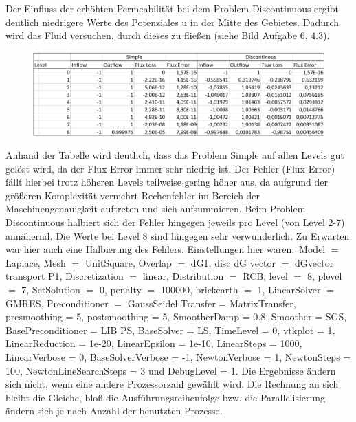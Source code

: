 \documentclass[12pt,a4paper]{scrartcl}
\numberwithin{equation}{section}
\begin{document}
\begin{enumerate}[label=(\roman*)]
%
Der Einfluss der erhöhten Permeabilität bei dem Problem Discontinuous ergibt deutlich niedrigere Werte des Potenziales u in der Mitte des Gebietes. Dadurch wird das Fluid versuchen, durch dieses zu fließen (siehe Bild Aufgabe 6, 4.3).
\begin{figure}[H]
	\centering
	\captionabove{}
	\includegraphics[width=\textwidth]{../A4Tabelle.png}
\end{figure}
Anhand der Tabelle wird deutlich, dass das Problem Simple auf allen Levels gut gelöst wird, da der Flux Error immer sehr niedrig ist. Der Fehler (Flux Error) fällt hierbei trotz höheren Levels teilweise gering höher aus, da aufgrund der größeren Komplexität vermehrt Rechenfehler im Bereich der Maschinengenauigkeit auftreten und sich aufsummieren. 
\newline Beim Problem Discontinuous halbiert sich der Fehler hingegen jeweils pro Level (von Level 2-7)
 annähernd. Die Werte bei Level 8 sind hingegen sehr verwunderlich. Zu Erwarten war hier auch eine Halbierung des Fehlers. \newline
Einstellungen hier waren$:$
\newline
 Model $=$ Laplace, Mesh $=$ UnitSquare, Overlap $=$ dG1,
  disc dG vector $=$
dGvector transport P1, Discretization $=$ linear,
  Distribution $=$ RCB, level $=$ 8, plevel $=$ 7, SetSolution $=$ 0, penalty $=$ 100000, brickearth $=$ 1, LinearSolver $=$ GMRES, Preconditioner $=$ GaussSeidel
Transfer = MatrixTransfer, 
presmoothing = 5, 
postsmoothing = 5, 
SmootherDamp = 0.8, 
Smoother = SGS, 
BasePreconditioner = LIB PS, 
BaseSolver = LS, 
TimeLevel = 0, 
vtkplot = 1, 
LinearReduction = 1e-20, 
LinearEpsilon = 1e-10, 
LinearSteps = 1000, 
LinearVerbose = 0, 
BaseSolverVerbose = -1, 
NewtonVerbose = 1, 
NewtonSteps = 100, 
NewtonLineSearchSteps = 3 und 
DebugLevel = 1.
\newline 
Die Ergebnisse ändern sich nicht, wenn eine andere Prozessorzahl gewählt wird. Die Rechnung an sich bleibt die Gleiche, bloß die Ausführungsreihenfolge bzw. die Parallelisierung ändern sich je nach Anzahl der benutzten Prozesse. 


\end{enumerate}
\end{document}
